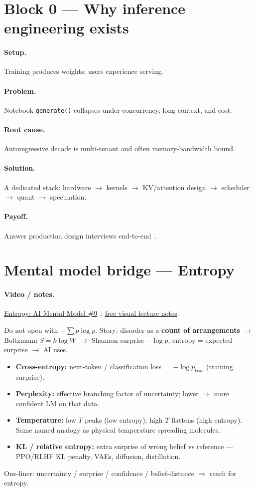 \documentclass[11pt,a4paper]{article}
\newcommand{\setup}{\paragraph{Setup.}}
\newcommand{\problem}{\paragraph{Problem.}}
\newcommand{\rootcause}{\paragraph{Root cause.}}
\newcommand{\solution}{\paragraph{Solution.}}
\newcommand{\payoff}{\paragraph{Payoff.}}
\begin{document}
\section{Block 0 --- Why inference engineering exists}
\setup Training produces weights; users experience serving.
\problem Notebook \texttt{generate()} collapses under concurrency, long context, and cost.
\rootcause Autoregressive decode is multi-tenant and often memory-bandwidth bound.
\solution A dedicated stack: hardware $\rightarrow$ kernels $\rightarrow$ KV/attention design $\rightarrow$ scheduler $\rightarrow$ quant $\rightarrow$ speculation.
\payoff Answer production design interviews end-to-end~\cite{vizuara-site}.

\section{Mental model bridge --- Entropy}
\paragraph{Video / notes.}
\href{https://www.youtube.com/watch?v=q3agYqgqklU}{Entropy: AI Mental Model \#9}~\cite{vizuara-entropy-yt};
\href{https://vizuaraai.github.io/great-mental-models-of-ai/lecture-09-entropy.html}{free visual lecture notes}.

Do not open with $-\sum p\log p$. Story:
disorder as a \textbf{count of arrangements} $\rightarrow$
Boltzmann $S=k\log W$ $\rightarrow$
Shannon surprise $-\log p$, entropy = expected surprise $\rightarrow$
AI uses.

\begin{itemize}[leftmargin=*]
  \item \textbf{Cross-entropy:} next-token / classification loss $= -\log p_{\mathrm{true}}$ (training surprise).
  \item \textbf{Perplexity:} effective branching factor of uncertainty; lower $\Rightarrow$ more confident LM on that data.
  \item \textbf{Temperature:} low $T$ peaks (low entropy); high $T$ flattens (high entropy). Same named analogy as physical temperature spreading molecules.
  \item \textbf{KL / relative entropy:} extra surprise of wrong belief vs reference --- PPO/RLHF KL penalty, VAEs, diffusion, distillation.
\end{itemize}
\noindent One-liner: uncertainty / surprise / confidence / belief-distance $\Rightarrow$ reach for entropy.
\end{document}
